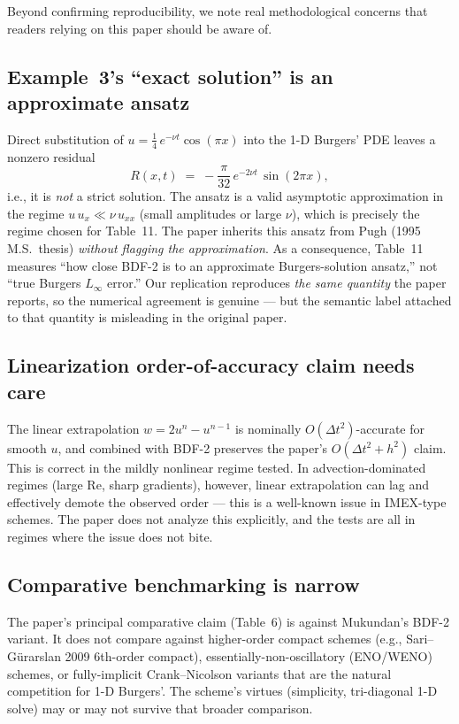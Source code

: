 \documentclass[11pt]{article}
\begin{document}
Beyond confirming reproducibility, we note real methodological concerns that
readers relying on this paper should be aware of.

\subsection{Example~3's ``exact solution'' is an approximate ansatz}
Direct substitution of \(u = \tfrac{1}{4}\,e^{-\nu t}\cos(\pi x)\) into the
1-D Burgers' PDE leaves a nonzero residual
\[
R(x,t) \;=\; -\frac{\pi}{32}\,e^{-2\nu t}\,\sin(2\pi x),
\]
i.e., it is \emph{not} a strict solution. The ansatz is a valid asymptotic
approximation in the regime \(u\,u_x \ll \nu\,u_{xx}\) (small amplitudes or
large \(\nu\)), which is precisely the regime chosen for Table~11. The paper
inherits this ansatz from Pugh (1995 M.S.\ thesis) \emph{without flagging the
approximation}. As a consequence, Table~11 measures ``how close BDF-2 is to
an approximate Burgers-solution ansatz,'' not ``true Burgers \(L_\infty\)
error.'' Our replication reproduces \emph{the same quantity} the paper
reports, so the numerical agreement is genuine --- but the semantic label
attached to that quantity is misleading in the original paper.

\subsection{Linearization order-of-accuracy claim needs care}
The linear extrapolation \(w = 2u^n - u^{n-1}\) is nominally
\(O(\Delta t^2)\)-accurate for smooth \(u\), and combined with BDF-2 preserves
the paper's \(O(\Delta t^2 + h^2)\) claim. This is correct in the mildly
nonlinear regime tested. In advection-dominated regimes (large Re, sharp
gradients), however, linear extrapolation can lag and effectively demote the
observed order --- this is a well-known issue in IMEX-type schemes. The paper
does not analyze this explicitly, and the tests are all in regimes where the
issue does not bite.

\subsection{Comparative benchmarking is narrow}
The paper's principal comparative claim (Table~6) is against Mukundan's
BDF-2 variant. It does not compare against higher-order compact schemes
(e.g., Sari--Gürarslan 2009 6th-order compact), essentially-non-oscillatory
(ENO/WENO) schemes, or fully-implicit Crank--Nicolson variants that are the
natural competition for 1-D Burgers'. The scheme's virtues (simplicity,
tri-diagonal 1-D solve) may or may not survive that broader comparison.
\end{document}
